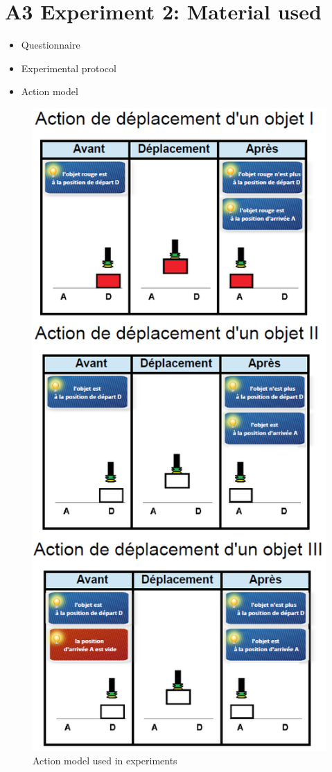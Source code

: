 \chapter{A3 Experiment 2: Material used}\label{Experimentation material}\label{Action Model}\label{Questionnaire}
\begin{itemize}
\item Questionnaire
\item Experimental protocol
\item Action model
\end{itemize}
  \begin{figure}[h]
    \centering
    \includegraphics[scale=0.7]{figures/schema-all}
    \caption{Action model used in experiments}
    \label{fig:schema-all}
  \end{figure}

